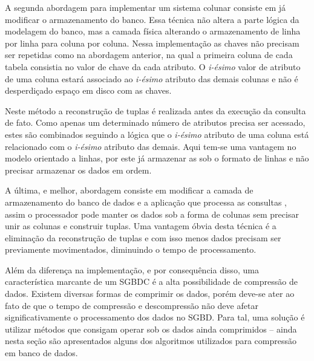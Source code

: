 
A segunda abordagem para implementar um sistema colunar consiste em já modificar o armazenamento do banco. Essa técnica não altera a parte 
lógica da modelagem do banco, mas a camada física alterando o armazenamento de 
linha por linha para coluna por coluna. Nessa implementação as chaves não precisam ser 
repetidas como na abordagem anterior, na qual a primeira coluna de cada tabela 
consistia no valor de chave da cada atributo. O \textit{i-ésimo} valor de atributo 
de uma coluna estará associado ao \textit{i-ésimo} atributo das demais colunas e 
não é desperdiçado espaço em disco com as chaves.

Neste método a reconstrução de tuplas é realizada antes da execução da consulta de fato. Como apenas um determinado número de atributos precisa ser acessado, estes são combinados seguindo a lógica que o \textit{i-ésimo} atributo de uma coluna está relacionado com o \textit{i-ésimo} atributo das demais. Aqui tem-se uma vantagem no modelo orientado a linhas, por este já armazenar as sob o formato de linhas e não precisar armazenar os dados em ordem.


A última, e melhor, abordagem consiste em modificar a camada de armazenamento do banco de dados e a aplicação que processa as consultas \cite{stonebraker2005c, boncz2005monetdb}, assim o processador pode manter os dados sob a forma de colunas sem precisar unir as colunas e construir tuplas. Uma vantagem óbvia desta técnica é a eliminação da reconstrução de tuplas e com isso menos dados precisam ser previamente movimentados, diminuindo 
o tempo de processamento.  


Além da diferença na implementação, e por consequência disso, uma característica marcante de um SGBDC é a alta possibilidade de compressão de dados. 
Existem diversas formas de comprimir os dados, porém deve-se ater ao fato de 
que o tempo de compressão e descompressão não deve afetar significativamente o processamento 
dos dados no SGBD. Para tal, uma solução é utilizar métodos que consigam operar sob os dados 
ainda comprimidos -- ainda nesta seção são apresentados alguns dos algoritmos utilizados para 
compressão em banco de dados.

